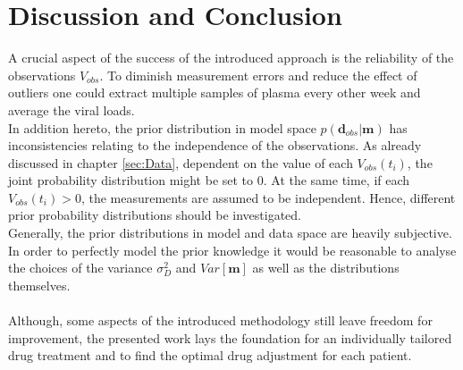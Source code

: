 \section{Discussion and Conclusion}
\label{sec:Dis}

A crucial aspect of the success of the introduced approach is the reliability of the observations $V_{obs}$.
To diminish measurement errors and reduce the effect of outliers one could extract multiple samples of plasma every other week and average the viral loads.\\
In addition hereto, the prior distribution in model space $p(\mathbf{d}_{obs}|\mathbf{m})$ has inconsistencies relating to the independence of the observations.
As already discussed in chapter \ref{sec:Data}, dependent on the value of each $V_{obs}(t_i)$, the joint probability distribution might be set to 0.
At the same time, if each $V_{obs}(t_i) > 0$, the measurements are assumed to be independent.
Hence, different prior probability distributions should be investigated.\\
Generally, the prior distributions in model and data space are heavily subjective.
In order to perfectly model the prior knowledge it would be reasonable to analyse the choices of the variance $\sigma_D^2$ and $Var[\mathbf{m}]$ as well as the distributions themselves.\\ \\
Although, some aspects of the introduced methodology still leave freedom for improvement, the presented work lays the foundation for an individually tailored drug treatment and to find the optimal drug adjustment for each patient.
